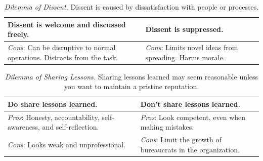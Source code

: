 

\begin{center}
\begin{table}[H] %
\begin{tabular}{ | m{\dilemmatablewidth}| m{\dilemmatablewidth} | } 
  \hline
  \textbf{Dissent is welcome and discussed freely.} & 
  \textbf{Dissent is suppressed.} \\ 
  \hline
  \textit{Cons}: Can be disruptive to normal operations. Distracts from the task. & 
  \textit{Cons}: Limits novel ideas from spreading. Harms morale. \\  
  \hline
\end{tabular}
\caption{
\textit{Dilemma of Dissent.}
Dissent is caused by dissatisfaction with people or processes. 
}
\label{table:dilemma-how-dissent-is-responded-to}
\end{table}
\end{center}



\begin{center}
\begin{table}[H] %
\begin{tabular}{ | m{\dilemmatablewidth}| m{\dilemmatablewidth} | } 
  \hline
  \textbf{Do share lessons learned.} & 
  \textbf{Don't share lessons learned.} \\ 
  \hline
  \textit{Pros}: Honesty, accountability, self-awareness, and self-reflection. & 
  \textit{Pros}: Look competent, even when making mistakes. \\  
  \hline
  \textit{Cons}: Looks weak and unprofessional. & 
  \textit{Cons}: Limit the growth of bureaucrats in the organization. \\  
  \hline
\end{tabular}
\caption{
\textit{Dilemma of Sharing Lessons.}
Sharing lessons learned may seem reasonable unless you want to maintain a pristine reputation. 
}
\label{table:dilemma-sharing-lessons-learned}
\end{table}
\end{center}


